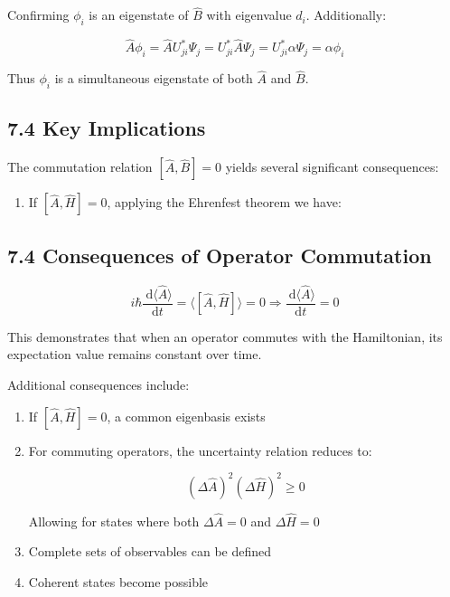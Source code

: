 \documentclass[italian]{HKNdocument}
\begin{document}
Confirming $\phi_{i}$ is an eigenstate of $\hat{B}$ with eigenvalue $d_i$. Additionally:

\begin{equation*}
\hat{A} \phi_{i}=\hat{A} U_{j i}^{*} \Psi_{j}=U_{j i}^{*} \hat{A} \Psi_{j}=U_{j i}^{*} \alpha \Psi_{j}=\alpha \phi_{i} \tag{7.35}
\end{equation*}

Thus $\phi_{i}$ is a simultaneous eigenstate of both $\hat{A}$ and $\hat{B}$.

\subsection*{7.4 Key Implications}
The commutation relation $[\hat{A}, \hat{B}]=0$ yields several significant consequences:

\begin{enumerate}
  \item If $[\hat{A}, \hat{H}]=0$, applying the Ehrenfest theorem we have:
\end{enumerate}


\subsection*{7.4 Consequences of Operator Commutation}

\begin{equation*}
i \hbar \frac{\mathrm{~d}\langle\hat{A}\rangle}{\mathrm{d} t}=\langle[\hat{A}, \hat{H}]\rangle=0 \Longrightarrow \frac{\mathrm{~d}\langle\hat{A}\rangle}{\mathrm{d} t}=0 \tag{7.36}
\end{equation*}

This demonstrates that when an operator commutes with the Hamiltonian, its expectation value remains constant over time.

Additional consequences include:
\begin{enumerate}
  \item If $[\hat{A}, \hat{H}]=0$, a common eigenbasis exists
  \item For commuting operators, the uncertainty relation reduces to:

\begin{equation*}
(\Delta \hat{A})^{2}(\Delta \hat{H})^{2} \geq 0 \tag{7.37}
\end{equation*}

  Allowing for states where both $\Delta \hat{A}=0$ and $\Delta \hat{H}=0$
  \item Complete sets of observables can be defined
  \item Coherent states become possible
\end{enumerate}
\end{document}
